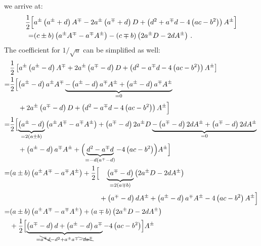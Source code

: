 we arrive at:
\begin{align}
  \frac{1}{2} \Bigl[ &
        a^{\pm} \left( a^{\pm} + d               \right) A^{\mp}
    - 2 a^{\pm} \left( a^{\mp} + d               \right) D
    +           \left( d^2 + a^{\mp}d -4\left(ac-b^2\right) \right) A^{\pm} \Bigr] \nonumber \\
 =&   (c \pm b) \left(   a^{\pm} A^{\mp} -   a^{\mp} A^{\pm} \right)
    - (c \mp b) \left( 2 a^{\pm} D       - 2 d       A^{\pm} \right) \, . \label{eqn:factor_S0_sqrt_c}
\end{align}
The coefficient for $1/\sqrt{a}$ can be simplified as well:
\begin{align}
 ~& \frac{1}{2} \left[
          a^{\pm} \left( a^{\pm} - d               \right) A^{\mp}
      + 2 a^{\pm} \left( a^{\mp} - d               \right) D
      +           \left( d^2 - a^{\mp}d -4\left(ac-b^2\right) \right) A^{\pm} \right] \nonumber \\
 =& \frac{1}{2} \Bigl[
                  \left( a^{\pm} - d \right) a^{\pm} A^{\mp}
    \underbrace{- \left( a^{\pm} - d \right) a^{\mp} A^{\pm}
                + \left( a^{\pm} - d \right) a^{\mp} A^{\pm}}_{=0} \nonumber \\
 ~& \phantom{\frac{1}{2} \Bigl[}
    + 2 a^{\pm} \left( a^{\mp} - d               \right) D
    +           \left( d^2 - a^{\mp}d -4\left(ac-b^2\right) \right) A^{\pm} \Bigr] \nonumber \\
 =& \frac{1}{2} \Bigl[
    \underbrace{\left( a^{\pm} - d \right)}_{=2(a\pm b)} \left( a^{\pm} A^{\mp} - a^{\mp} A^{\pm} \right)
                + \left( a^{\mp} - d \right) 2 a^{\pm} D
    \underbrace{- \left( a^{\mp} - d \right) 2 d       A^{\pm}
                + \left( a^{\mp} - d \right) 2 d       A^{\pm}}_{=0} \nonumber \\
 ~& \phantom{\frac{1}{2} \Bigl[}
    + \left( a^{\pm} - d \right) a^{\mp} A^{\pm}
    + \Bigl( \underbrace{d^2 - a^{\mp}d}_{=-d(a^{\mp}-d)} -4\left(ac-b^2\right) \Bigr) A^{\pm} \Bigr] \nonumber \\
 =& (a\pm b) \left( a^{\pm} A^{\mp} - a^{\mp} A^{\pm} \right)
    + \frac{1}{2} \Bigl[
    \phantom{+}\,
    \underbrace{\left( a^{\mp} - d \right)}_{=2(a\mp b)} \left( 2 a^{\pm} D - 2 d A^{\pm} \right) \nonumber \\
 ~& \phantom{
      (a\pm b) \left( a^{\pm} A^{\mp} - a^{\mp} A^{\pm} \right)
      + \frac{1}{2} \Bigl[
    }
    + \left( a^{\mp} - d \right) d A^{\pm}
    + \left( a^{\pm} - d \right) a^{\mp} A^{\pm}
    -4\left(ac-b^2\right) A^{\pm} \Bigr] \nonumber \\
 =&   (a\pm b) \left( a^{\pm} A^{\mp} - a^{\mp} A^{\pm} \right)
    + (a\mp b) \left( 2 a^{\pm} D - 2 d A^{\pm} \right) \nonumber \\
 ~& + \frac{1}{2} \Bigl[
        \underbrace{
            \left( a^{\mp} - d \right) d
        +   \left( a^{\pm} - d \right) a^{\mp}
        }_{=\bcancel{a^{\mp} d} - d^2 + a^{\pm}a^{\mp} \bcancel{- d a^{\mp}} }
        - 4 \left(ac-b^2\right) \Bigr]  A^{\pm}
\end{align}
